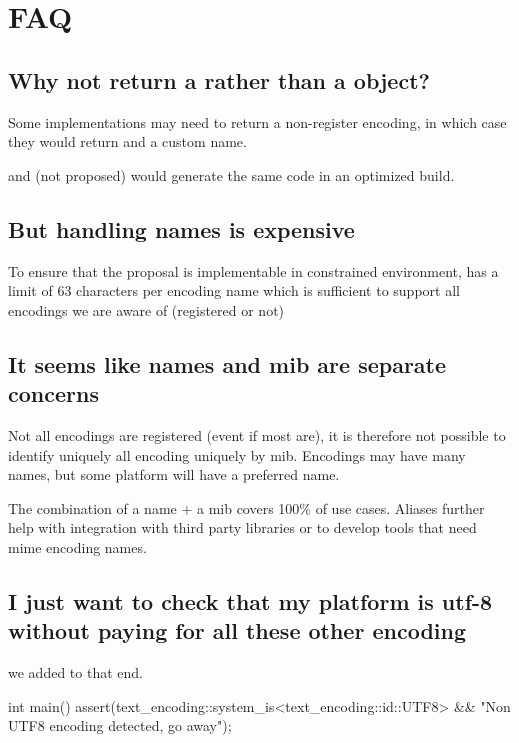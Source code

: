 \documentclass{wg21}
\begin{document}
\section{FAQ}
\subsection{Why not return a  rather than a  object?}
Some implementations may need to return a non-register encoding, in which case they would return  and a custom name.

 and  (not proposed) would generate the same code in an optimized build.


\subsection{But handling names is expensive}
To ensure that the proposal is implementable in constrained environment,  has a limit of 63 characters per encoding name
which is sufficient to support all encodings we are aware of (registered or not)

\subsection{It seems like names and mib are separate concerns}

Not all encodings are registered (event if most are), it is therefore not possible to identify uniquely all encoding uniquely by mib.
Encodings may have many names, but some platform will have a preferred name.

The combination of a name + a mib covers 100\% of use cases. Aliases further help with integration with third party libraries or to develop
tools that need mime encoding names.

\subsection{I just want to check that my platform is utf-8 without paying for all these other encoding}

we added  to that end.

\begin{codeblock}
    int main() {
        assert(text_encoding::system_is<text_encoding::id::UTF8>
                  && "Non UTF8 encoding detected, go away");
    }
\end{codeblock}
\end{document}
